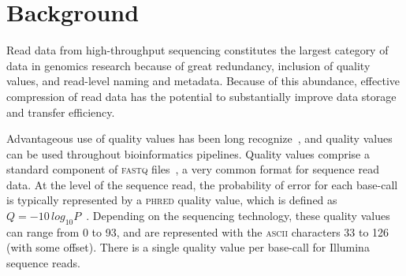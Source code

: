\documentclass{bmcart}
\begin{document}


\section*{Background}
Read data from high-throughput sequencing constitutes the largest
category of data in genomics research because of great redundancy,
inclusion of quality values, and read-level naming and
metadata. Because of this abundance, effective compression of read
data has the potential to substantially improve data storage and
transfer efficiency.

Advantageous use of quality values has been long
recognize~\cite{Bonfield:1995kq}, and quality values can be used
throughout bioinformatics pipelines.  Quality values comprise a
standard component of \textsc{fastq} files~\cite{Cock:2010ve}, a very
common format for sequence read data. At the level of the sequence
read, the probability of error for each base-call is typically
represented by a \textsc{phred} quality value, which is defined as $Q
= -10\,log_{10}P$~\cite{Ewing:1998ly}. Depending on the sequencing
technology, these quality values can range from 0 to 93, and are
represented with the \textsc{ascii} characters 33 to 126 (with some
offset). There is a single quality value per base-call for Illumina
sequence reads.
\end{document}
